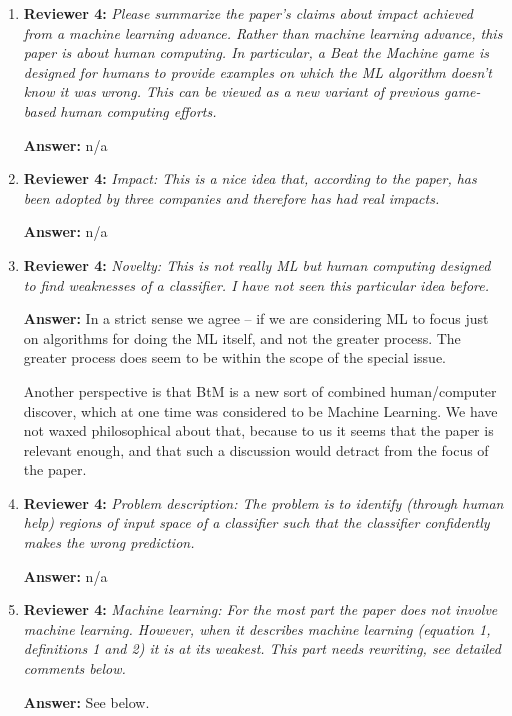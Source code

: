 \documentclass[letterpaper]{article}
\begin{document}
\begin{enumerate}

\item \textbf{Reviewer 4:} \emph{Please summarize the paper's claims about impact achieved from a machine learning advance. Rather than machine learning advance, this paper is about human computing.  In particular, a Beat the Machine game is designed for humans to provide examples on which the ML algorithm doesn't know it was wrong.  This can be viewed as a new variant of previous game-based human computing efforts.}

\textbf{Answer:} n/a

\item \textbf{Reviewer 4:} \emph{ Impact: This is a nice idea that, according to the paper, has been adopted by three companies and therefore has had real impacts.}

\textbf{Answer:} n/a

\item \textbf{Reviewer 4:} \emph{ Novelty: This is not really ML but human computing designed to find weaknesses of a classifier.  I have not seen this particular idea before.}

\textbf{Answer:} In a strict sense we agree -- if we are considering ML to focus just on algorithms for doing the ML itself, and not the greater process.  The greater process does seem to be within the scope of the special issue.  

Another perspective is that BtM is a new sort of combined human/computer discover, which at one time was considered to be Machine Learning.  We have not waxed philosophical about that, because to us it seems that the paper is relevant enough, and that such a discussion would detract from the focus of the paper.

\item \textbf{Reviewer 4:} \emph{ Problem description: The problem is to identify (through human help) regions of input space of a classifier such that the classifier confidently makes the wrong prediction.}

\textbf{Answer:} n/a

\item \textbf{Reviewer 4:} \emph{ Machine learning: For the most part the paper does not involve machine learning.  However, when it describes machine learning (equation 1, definitions 1 and 2) it is at its weakest.  This part needs rewriting, see detailed comments below.}

\textbf{Answer:} See below.


\end{enumerate}
\end{document}
